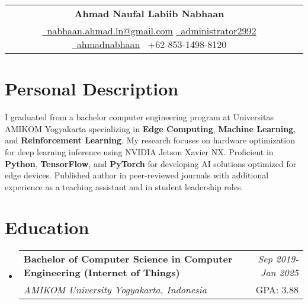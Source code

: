 \documentclass[a4paper,11pt]{article}
\makeatletter
\newcommand{\resumeSubheading}[4]{
\vspace{0.5mm}\item
    \begin{tabular*}{0.98\textwidth}[t]{l@{\extracolsep{\fill}}r}
        \textbf{#1} & \textit{\footnotesize{#4}} \\
        \textit{\footnotesize{#3}} &  \footnotesize{#2}\\
    \end{tabular*}
    \vspace{-2.4mm}
}
\newcommand{\resumeSubHeadingListStart}{\begin{itemize}[leftmargin=*,labelsep=0mm]}
\newcommand{\resumeSubHeadingListEnd}{\end{itemize}\vspace{2mm}}
\newcommand{\name}{Ahmad Naufal Labiib Nabhaan} %
\newcommand{\phone}{+62 853-1498-8120} %
\newcommand{\emaila}{nabhaan.ahmad.ln@gmail.com} %
\makeatother
\begin{document}
\selectfont

{
\begin{center}
\begin{tabularx}{\linewidth}{C r} %
  \\
  \textbf{\Huge \name} \\ %
  \href{mailto:\emaila}{\raisebox{0.0\height}{\footnotesize \faEnvelope}\ {\emaila}} \href{https://github.com/administrator2992}{\raisebox{0.0\height}{\footnotesize \faGithub}\ {administrator2992}} \href{https://linkedin.com/in/ahmadnabhaan/}{\raisebox{0.0\height}{\footnotesize \faLinkedin}\ {ahmadnabhaan}} \raisebox{0.0\height}{\footnotesize \faPhone}\ {\phone}
\end{tabularx}
\end{center}

}

\section{\textbf{Personal Description}}
\vspace{2.5mm}
\begin{adjustwidth}{0mm}{0mm}
  \justifying  %
  \setlength{\parindent}{0pt}  %
  \setlength{\parskip}{2pt}    %
  
  I graduated from a bachelor computer engineering program at Universitas AMIKOM Yogyakarta specializing in \textbf{Edge Computing}, \textbf{Machine Learning}, and \textbf{Reinforcement Learning}. My research focuses on hardware optimization for deep learning inference using NVIDIA Jetson Xavier NX. Proficient in \textbf{Python}, \textbf{TensorFlow}, and \textbf{PyTorch} for developing AI solutions optimized for edge devices. Published author in peer-reviewed journals with additional experience as a teaching assistant and in student leadership roles.
  
  \end{adjustwidth}
\vspace{-2.5mm}

\section{\textbf{Education}}
  \resumeSubHeadingListStart
    \resumeSubheading
      {Bachelor of Computer Science in Computer Engineering (Internet of Things)}{GPA: 3.88}
      {AMIKOM University Yogyakarta, Indonesia}{Sep 2019- Jan 2025}
  \resumeSubHeadingListEnd
\vspace{-2.5mm}
%
\end{document}
